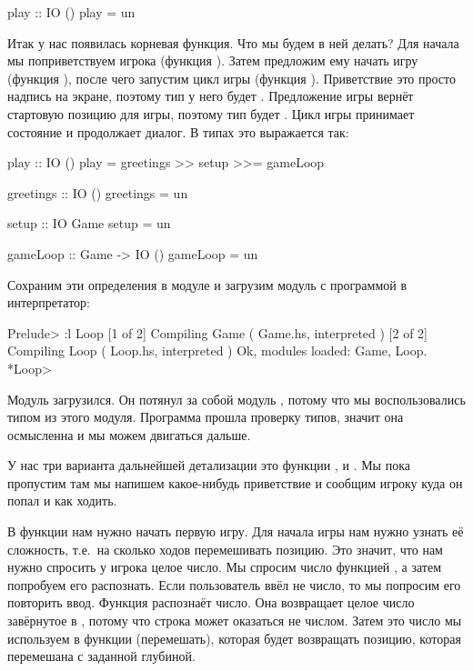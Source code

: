 \begin{code}
play :: IO ()
play = un
\end{code}

Итак у нас появилась корневая функция. Что мы будем
в ней делать? Для начала мы поприветствуем игрока
(функция ). Затем предложим ему начать игру
(функция ), после чего 
запустим цикл игры (функция ). Приветствие это просто надпись
на экране, поэтому тип у него будет . 
Предложение игры вернёт стартовую позицию для игры,
поэтому тип будет . Цикл игры принимает
состояние и продолжает диалог. В типах это выражается
так:

\begin{code}
play :: IO ()
play = greetings >> setup >>= gameLoop

greetings :: IO ()
greetings = un

setup :: IO Game
setup = un

gameLoop :: Game -> IO ()
gameLoop = un
\end{code}

Сохраним эти определения в модуле  и загрузим модуль 
с программой в интерпретатор:

\begin{code}
Prelude> :l Loop
[1 of 2] Compiling Game             ( Game.hs, interpreted )
[2 of 2] Compiling Loop             ( Loop.hs, interpreted )
Ok, modules loaded: Game, Loop.
*Loop> 
\end{code}

Модуль загрузился. Он потянул за собой модуль ,
потому что мы воспользовались типом  из этого модуля.
Программа прошла проверку типов, значит она осмысленна и
мы можем двигаться дальше. 

У нас три варианта дальнейшей детализации это функции 
,  и . Мы пока
пропустим  там мы напишем какое-нибудь 
приветствие и сообщим игроку куда он попал и как ходить. 

В функции  нам нужно начать первую игру.
Для начала игры нам нужно узнать её сложность, т.е.~на
сколько ходов перемешивать позицию. Это значит, что
нам нужно спросить у игрока целое число. Мы спросим
число функцией , а затем попробуем его распознать.
Если пользователь ввёл не число, то мы попросим его повторить ввод.
Функция \mbox{} распознаёт число. 
Она возвращает целое число завёрнутое в , потому что 
строка может оказаться не числом. Затем это число мы используем 
в функции  (перемешать), которая будет возвращать
позицию, которая перемешана с заданной глубиной.

